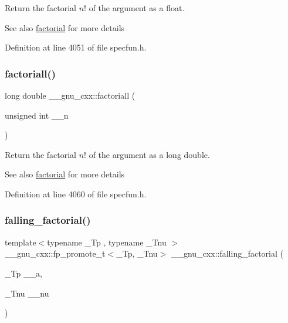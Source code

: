 Return the factorial $ n! $ of the argument as a {\ttfamily float}.

\begin{DoxySeeAlso}{See also}
\hyperlink{group__gnu__math__spec__func_ga963b1612f50b0964f5f42c9f289aab68}{factorial} for more details 
\end{DoxySeeAlso}


Definition at line 4051 of file specfun.\+h.

\mbox{\label{group__gnu__math__spec__func_ga0904e504fdc3c8b9b6f5c66a73531584}} 
\subsubsection{\texorpdfstring{factoriall()}{factoriall()}}
{\footnotesize\ttfamily long double \+\_\+\+\_\+gnu\+\_\+cxx\+::factoriall (\begin{DoxyParamCaption}\item[{unsigned int}]{\+\_\+\+\_\+n }\end{DoxyParamCaption})\hspace{0.3cm}{\ttfamily [inline]}}

Return the factorial $ n! $ of the argument as a {\ttfamily long double}.

\begin{DoxySeeAlso}{See also}
\hyperlink{group__gnu__math__spec__func_ga963b1612f50b0964f5f42c9f289aab68}{factorial} for more details 
\end{DoxySeeAlso}


Definition at line 4060 of file specfun.\+h.

\mbox{\label{group__gnu__math__spec__func_ga3cc8eb6068c7155ec48b40e20160c5c0}} 
\subsubsection{\texorpdfstring{falling\+\_\+factorial()}{falling\_factorial()}}
{\footnotesize\ttfamily template$<$typename \+\_\+\+Tp , typename \+\_\+\+Tnu $>$ \\
\+\_\+\+\_\+gnu\+\_\+cxx\+::fp\+\_\+promote\+\_\+t$<$\+\_\+\+Tp, \+\_\+\+Tnu$>$ \+\_\+\+\_\+gnu\+\_\+cxx\+::falling\+\_\+factorial (\begin{DoxyParamCaption}\item[{\+\_\+\+Tp}]{\+\_\+\+\_\+a,  }\item[{\+\_\+\+Tnu}]{\+\_\+\+\_\+nu }\end{DoxyParamCaption})\hspace{0.3cm}{\ttfamily [inline]}}




